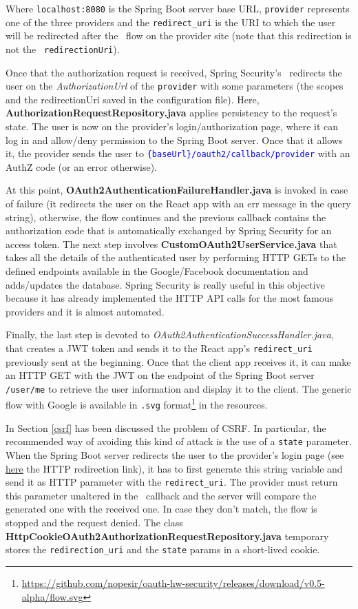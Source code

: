 \noindent Where \texttt{localhost:8080} is the Spring Boot server base URL, \texttt{provider} represents one of the three providers and the \texttt{redirect\_uri} is the URI to which the user will be redirected after the \oauth\ flow on the provider site (note that this redirection is not the \oauth\ \texttt{redirectionUri}).

Once that the authorization request is received, Spring Security's \oauth\ redirects the user on the \textit{AuthorizationUrl} of the \texttt{provider} with some parameters (the scopes and the redirectionUri saved in the configuration file). Here, \textbf{AuthorizationRequestRepository.java} applies persistency to the request's state. The user is now on the provider's login/authorization page, where it can log in and allow/deny permission to the Spring Boot server. Once that it allows it, the provider sends the user to \textcolor{blue}{\texttt{\{baseUrl\}/oauth2/callback/provider}} with an AuthZ code (or an error otherwise).

At this point, \textbf{OAuth2AuthenticationFailureHandler.java} is invoked in case of failure (it redirects the user on the React app with an err message in the query string), otherwise, the flow continues and the previous callback contains the authorization code that is automatically exchanged by Spring Security for an access token. The next step involves \textbf{CustomOAuth2UserService.java} that takes all the details of the authenticated user by performing HTTP GETs to the defined endpoints available in the Google/Facebook documentation and adds/updates the database. Spring Security is really useful in this objective because it has already implemented the HTTP API calls for the most famous providers and it is almost automated. 

Finally, the last step is devoted to \textit{OAuth2AuthenticationSuccessHandler.java}, that creates a JWT token and sends it to the React app's \texttt{redirect\_uri} previously sent at the beginning. Once that the client app receives it, it can make an HTTP GET with the JWT on the endpoint of the Spring Boot server \texttt{/user/me} to retrieve the user information and display it to the client. The generic flow with Google is available in \texttt{.svg} format\footnote{\url{https://github.com/nopesir/oauth-hw-security/releases/download/v0.5-alpha/flow.svg}} in the resources.


In Section \ref{csrf} has been discussed the problem of CSRF. In particular, the recommended way of avoiding this kind of attack is the use of a \texttt{state} parameter. When the Spring Boot server redirects the user to the provider's login page (see \hyperlink{foo}{here} the HTTP redirection link), it has to first generate this string variable and send it as HTTP parameter with the \texttt{redirect\_uri}. The provider must return this parameter unaltered in the \oauth\ callback and the server will compare the generated one with the received one. In case they don't match, the flow is stopped and the request denied.
The class \textbf{HttpCookieOAuth2AuthorizationRequestRepository.java} temporary stores the \texttt{redirection\_uri} and the \texttt{state} params in a short-lived cookie.

